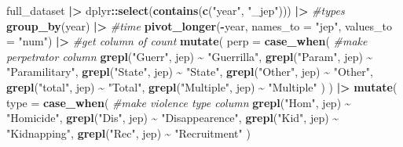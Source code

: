 \documentclass[
]{article}
\newenvironment{Shaded}{\begin{snugshade}}{\end{snugshade}}
\newcommand{\AttributeTok}[1]{\textcolor[rgb]{0.13,0.29,0.53}{#1}}
\newcommand{\CommentTok}[1]{\textcolor[rgb]{0.56,0.35,0.01}{\textit{#1}}}
\newcommand{\FunctionTok}[1]{\textcolor[rgb]{0.13,0.29,0.53}{\textbf{#1}}}
\newcommand{\NormalTok}[1]{#1}
\newcommand{\SpecialCharTok}[1]{\textcolor[rgb]{0.81,0.36,0.00}{\textbf{#1}}}
\newcommand{\StringTok}[1]{\textcolor[rgb]{0.31,0.60,0.02}{#1}}
\begin{document}
\begin{Shaded}
\begin{Highlighting}[]
\NormalTok{full\_dataset }\SpecialCharTok{|\textgreater{}}
\NormalTok{  dplyr}\SpecialCharTok{::}\FunctionTok{select}\NormalTok{(}\FunctionTok{contains}\NormalTok{(}\FunctionTok{c}\NormalTok{(}\StringTok{"year"}\NormalTok{, }\StringTok{"\_jep"}\NormalTok{))) }\SpecialCharTok{|\textgreater{}} \CommentTok{\#types}
  \FunctionTok{group\_by}\NormalTok{(year) }\SpecialCharTok{|\textgreater{}} \CommentTok{\#time}
  \FunctionTok{pivot\_longer}\NormalTok{(}\SpecialCharTok{{-}}\NormalTok{year, }\AttributeTok{names\_to =} \StringTok{"jep"}\NormalTok{, }\AttributeTok{values\_to =} \StringTok{"num"}\NormalTok{) }\SpecialCharTok{|\textgreater{}} \CommentTok{\#get column of count}
  \FunctionTok{mutate}\NormalTok{(}
    \AttributeTok{perp =} \FunctionTok{case\_when}\NormalTok{( }\CommentTok{\#make perpetrator column}
      \FunctionTok{grepl}\NormalTok{(}\StringTok{"Guerr"}\NormalTok{, jep) }\SpecialCharTok{\textasciitilde{}} \StringTok{"Guerrilla"}\NormalTok{,}
      \FunctionTok{grepl}\NormalTok{(}\StringTok{"Param"}\NormalTok{, jep) }\SpecialCharTok{\textasciitilde{}} \StringTok{"Paramilitary"}\NormalTok{,}
      \FunctionTok{grepl}\NormalTok{(}\StringTok{"State"}\NormalTok{, jep) }\SpecialCharTok{\textasciitilde{}} \StringTok{"State"}\NormalTok{,}
      \FunctionTok{grepl}\NormalTok{(}\StringTok{"Other"}\NormalTok{, jep) }\SpecialCharTok{\textasciitilde{}} \StringTok{"Other"}\NormalTok{,}
      \FunctionTok{grepl}\NormalTok{(}\StringTok{"total"}\NormalTok{, jep) }\SpecialCharTok{\textasciitilde{}} \StringTok{"Total"}\NormalTok{,}
      \FunctionTok{grepl}\NormalTok{(}\StringTok{"Multiple"}\NormalTok{, jep) }\SpecialCharTok{\textasciitilde{}} \StringTok{"Multiple"}
\NormalTok{    )}
\NormalTok{  ) }\SpecialCharTok{|\textgreater{}}
  \FunctionTok{mutate}\NormalTok{(}
    \AttributeTok{type =} \FunctionTok{case\_when}\NormalTok{( }\CommentTok{\#make violence type column}
      \FunctionTok{grepl}\NormalTok{(}\StringTok{"Hom"}\NormalTok{, jep) }\SpecialCharTok{\textasciitilde{}} \StringTok{"Homicide"}\NormalTok{,}
      \FunctionTok{grepl}\NormalTok{(}\StringTok{"Dis"}\NormalTok{, jep) }\SpecialCharTok{\textasciitilde{}} \StringTok{"Disappearence"}\NormalTok{,}
      \FunctionTok{grepl}\NormalTok{(}\StringTok{"Kid"}\NormalTok{, jep) }\SpecialCharTok{\textasciitilde{}} \StringTok{"Kidnapping"}\NormalTok{,}
      \FunctionTok{grepl}\NormalTok{(}\StringTok{"Rec"}\NormalTok{, jep) }\SpecialCharTok{\textasciitilde{}} \StringTok{"Recruitment"}
\NormalTok{    )}

\end{Highlighting}
\end{Shaded}
\end{document}
